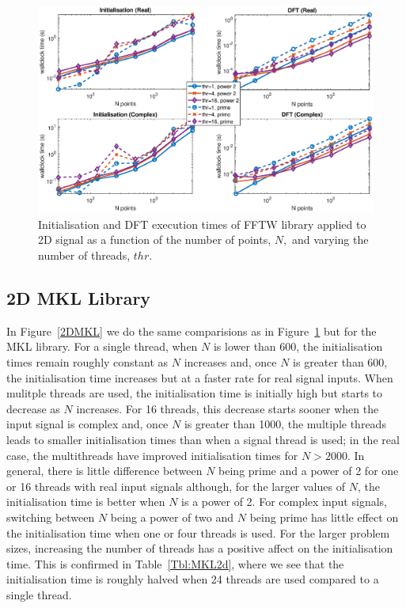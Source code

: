 \documentclass[a4paper]{article}
\begin{document}
\begin{figure}[htb]
    \centering
    \includegraphics[width=0.9\linewidth]{../results/fftw_2d_thr.eps}
  \caption{Initialisation and DFT execution times of FFTW library applied to 2D signal as a function of the
    number of points, $N,$ and varying the number of threads, $thr.$ }
  \label{2DFFTW}
\end{figure}



\subsection{2D MKL Library}\label{Sec:2DMKL}

In Figure~\ref{2DMKL} we do the same comparisions as in
Figure~\ref{2DFFTW} but for the MKL library. For a single thread, when
$N$ is lower than 600, the initialisation times remain roughly
constant as $N$ increases and, once $N$ is greater than 600, the
initialisation time increases but at a faster rate for real signal
inputs. When mulitple threads are used, the initialisation time is
initially high but starts to decrease as $N$ increases. For 16
threads, this decrease starts sooner when the input signal is complex
and, once $N$ is greater than 1000, the multiple threads leads to
smaller initialisation times than when a signal thread is used; in the
real case, the multithreads have improved initialisation times for
$N>2000.$ In general, there is little difference between $N$ being
prime and a power of 2 for one or 16 threads with real input signals
although, for the larger values of $N$, the initialisation time is
better when $N$ is a power of 2. For complex input signals, switching
between $N$ being a power of two and $N$ being prime has little effect
on the initialisation time when one or four threads is used. For the
larger problem sizes, increasing the number of threads has a positive
affect on the initialisation time.  This is confirmed in
Table~\ref{Tbl:MKL2d}, where we see that the initialisation time is
roughly halved when 24 threads are used compared to a single thread.
\end{document}
